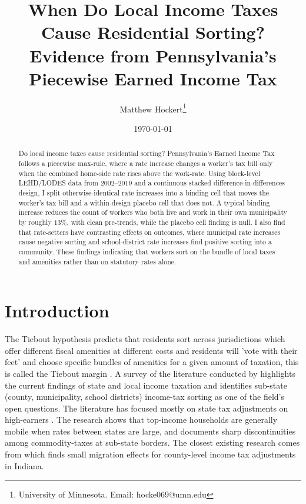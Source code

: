 \documentclass[12pt]{article}
\title{When Do Local Income Taxes Cause Residential Sorting? \\
\large Evidence from Pennsylvania's Piecewise Earned Income Tax}
\author{Matthew Hockert\thanks{University of Minnesota. Email: hocke069@umn.edu}}
\date{\today}
\begin{document}
\maketitle

\begin{abstract}
Do local income taxes cause residential sorting? Pennsylvania's
Earned Income Tax follows a piecewise max-rule, where a rate
increase changes a worker's tax bill only when the combined
home-side rate rises above the work-rate.
Using block-level LEHD/LODES data from 2002--2019 and a continuous
stacked difference-in-differences design, I split
otherwise-identical rate increases into a binding cell that moves
the worker's tax bill and a within-design placebo cell that does not. A
typical binding increase reduces the count of workers who both live
and work in their own municipality by roughly $13\%$, with clean
pre-trends, while the placebo cell finding is null. I also find that rate-setters have contrasting effects on outcomes, where municipal rate increases cause negative sorting and school-district rate increases find positive sorting into a community. These findings indicating that workers sort on the
bundle of local taxes and amenities rather than on statutory rates
alone.
\end{abstract}

\newpage

\section{Introduction}
\label{sec:intro}

The Tiebout hypothesis predicts that residents sort across
jurisdictions which offer different fiscal amenities at different costs and residents will 'vote with their feet' and choose specific bundles of amenities for a given amount of taxation, this is called the Tiebout margin \citep{tiebout1956}. A survey of the literature conducted by \citet{agrawalLessonsStateLocal} highlights the current findings of state and local income taxation and identifies sub-state (county, municipality, school districts) income-tax sorting as one of the field's open questions.
The literature has focused mostly on state tax adjustments on high-earners
\citep{young2016, agrawalRelocationRichMigration2019}. The research shows that
top-income households are generally mobile when rates between states are large, and \citet{agrawal2015gradient} documents sharp discontinuities among commodity-taxes at sub-state borders. The closest existing research comes from
\citet{yangRESPONSIVENESSINCOMELOCAL2017} which  finds small migration effects for county-level income tax adjustments in Indiana.
\end{document}

